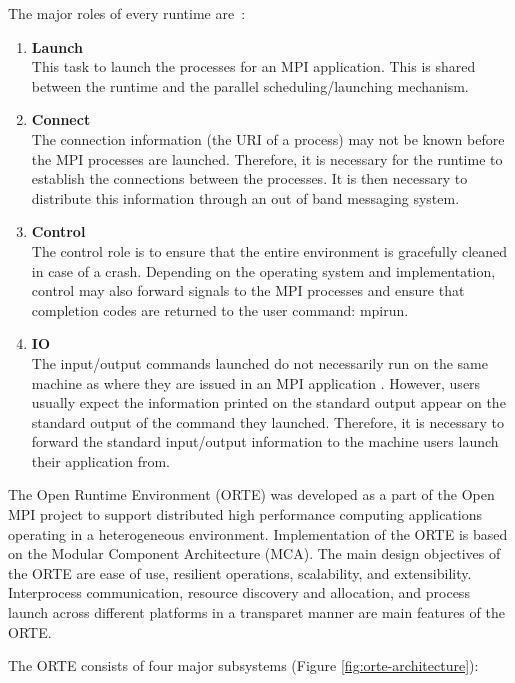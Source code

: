 The major roles of every runtime are~\cite{bosilca2011scalability}:
\begin{enumerate}
\item \textbf{Launch}\\
  This task to launch the processes for an MPI application. This is shared between the runtime and the parallel scheduling/launching mechanism.
\item \textbf{Connect}\\
  The connection information (the URI of a process) may not be known before the MPI processes are launched. Therefore, it is necessary for the runtime to establish the connections between the processes.  It is then necessary to distribute this information through an out of band messaging system. 
\item \textbf{Control}\\
  The control role is to ensure that the entire environment is gracefully cleaned in case of a crash. Depending on the operating system and implementation, control may also forward signals to the MPI processes and ensure that completion codes
are returned to the user command: mpirun.
\item \textbf{IO}\\
  The input/output commands launched do not necessarily run on the same machine as where they are issued in an MPI application . However, users usually expect the information printed on the standard output appear on the standard output of the command they launched.  Therefore, it is necessary to forward the standard input/output information to the machine users launch their application from. 
\end{enumerate}

The Open Runtime Environment (ORTE) was developed as a part of the Open MPI project to support distributed high performance computing applications operating in a heterogeneous environment. Implementation of the ORTE is based on the Modular Component Architecture (MCA). The main design objectives of the ORTE are ease of use, resilient operations, scalability, and extensibility. Interprocess communication, resource discovery and allocation, and process launch across different platforms in a transparet manner are main features of the ORTE\cite{castain2005open,hpcwire}.

The ORTE consists of four major subsystems (Figure \ref{fig:orte-architecture})\cite{castain2005open,castain2008open,Castain2008153}:

